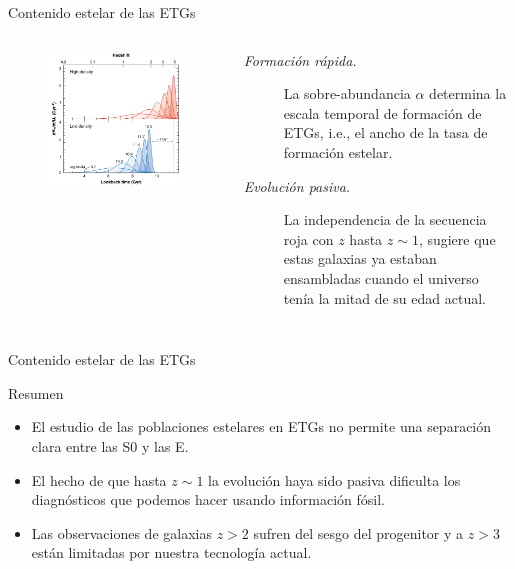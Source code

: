 \documentclass[xcolor=dvipsnames,4pt]{beamer}
\newenvironment{changemargin}[2]{%
  \begin{list}{}{%
    \setlength{\topsep}{0pt}%
    \setlength{\leftmargin}{#1}%
    \setlength{\rightmargin}{#2}%
    \setlength{\listparindent}{\parindent}%
    \setlength{\itemindent}{\parindent}%
    \setlength{\parsep}{\parskip}%
  }%
\item[]}{\end{list}}
\begin{document}
\begin{frame}{Contenido estelar de las ETGs}
\begin{changemargin}{-1cm}{-1cm}
\begin{columns}
\begin{figure}
\includegraphics[scale=0.81]{img/sfhs.png}
\end{figure}
\small
\begin{description}
\item[{\it\color{teal}Formación rápida.}] La sobre-abundancia $\alpha$ determina la escala temporal de formación de ETGs, i.e., el ancho de la tasa de formación estelar.
\item[{\it\color{teal}Evolución pasiva.}] La independencia de la secuencia roja con $z$ hasta $z\sim1$, sugiere que estas galaxias ya estaban ensambladas cuando el universo tenía la mitad de su edad actual.
\end{description}\end{columns}
\end{changemargin}
\end{frame}

\begin{frame}{Contenido estelar de las ETGs}
\begin{block}{Resumen}
\begin{itemize}
\item El estudio de las poblaciones estelares en ETGs no permite una separación clara entre las S0 y las E.
\item El hecho de que hasta $z\sim1$ la evolución haya sido pasiva dificulta los diagnósticos que podemos hacer usando información fósil.
\item Las observaciones de galaxias $z>2$ sufren del sesgo del progenitor y a $z>3$ están limitadas por nuestra tecnología actual.
\end{itemize}
\end{block}
\end{frame}
\end{document}
